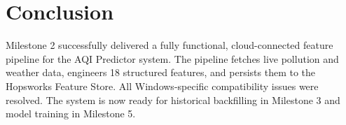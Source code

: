 \documentclass[conference]{IEEEtran}
\begin{document}
\section{Conclusion}

Milestone 2 successfully delivered a fully functional, cloud-connected feature pipeline for the AQI Predictor system. The pipeline fetches live pollution and weather data, engineers 18 structured features, and persists them to the Hopsworks Feature Store. All Windows-specific compatibility issues were resolved. The system is now ready for historical backfilling in Milestone 3 and model training in Milestone 5.
\end{document}
